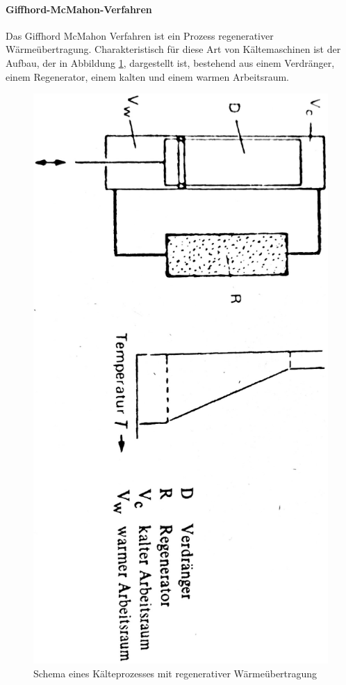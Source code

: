 \documentclass[parskip=half, a4paper,twoside,final]{article}
\begin{document}
\paragraph{Giffhord-McMahon-Verfahren}
Das Giffhord McMahon Verfahren ist ein Prozess regenerativer Wärmeübertragung. Charakteristisch für diese Art von Kältemaschinen ist der Aufbau, der in Abbildung \ref{fig:Kältemaschine}, dargestellt ist, bestehend aus einem Verdränger, einem Regenerator, einem kalten und einem warmen Arbeitsraum.

\begin{figure}[htp]
    \centering
        \includegraphics[height=0.9\textwidth, angle=90]{Bilder/Kalteprozess regenerativer Wärmeübertragung.pdf}
    \caption{Schema eines Kälteprozesses mit regenerativer Wärmeübertragung}
    \label{fig:Kältemaschine}
\end{figure}
\end{document}
